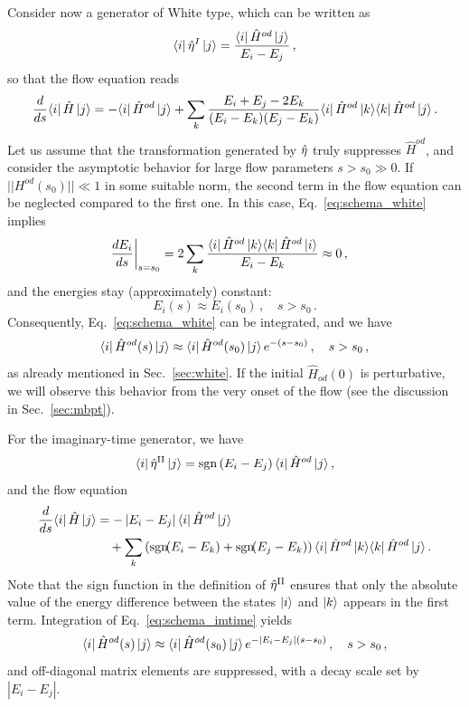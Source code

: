 Consider now a generator of White type, which can be written as
\begin{equation}
  \langle{i}|\,{\hat{\eta}^I}\,|{j}\rangle=\frac{\langle{i}|\,{\hat{H}^{od}}\,|{j}\rangle}{E_i-E_j}\,,
\end{equation}
so that the flow equation reads
\begin{align}
  \totd{}{s}\matrixe{i}{\hat{H}}{j}
  =-\matrixe{i}{\hat{H}^{od}}{j}
  +\sum_k\frac{E_i+E_j-2E_k}{(E_i-E_k)(E_j-E_k)}\matrixe{i}{\hat{H}^{od}}{k}\matrixe{k}{\hat{H}^{od}}{j}\,.\label{eq:schema_white}
\end{align}
Let us assume that the transformation generated by $\hat{\eta}$ truly
suppresses $\hat{H}^{od}$, and consider the asymptotic behavior for
large flow parameters $s>s_0\gg0$. If $||H^{od}(s_0)||\ll 1$ in some
suitable norm, the second term in the flow equation can be neglected
compared to the first one. In this case, Eq.~\eqref{eq:schema_white}
implies
\begin{align}
  \left. \frac{d {E_i}} {d {s}} \right|_{s=s_0}&=2\sum_k\frac{\langle{i}|\,{\hat{H}^{od}}\,|{k}\rangle\langle{k}|\,{\hat{H}^{od}}\,|{i}\rangle}{E_i-E_k}
  \approx0\,,
\end{align}
and the energies stay (approximately) constant:
\begin{equation}
  E_i(s) \approx E_i(s_0)\,,\quad s>s_0\,.
\end{equation}
Consequently, Eq.~\eqref{eq:schema_white} can be integrated, and we have
\begin{equation}
  \langle{i}|\,{\hat{H}^{od}(s)}\,|{j}\rangle \approx \langle{i}|\,{\hat{H}^{od}(s_0)}\,|{j}\rangle\,e^{-(s-s_0)}\,,\quad s>s_0\,,
\end{equation}
as already mentioned in Sec.~\ref{sec:white}. If the initial
$\hat{H}_{od}(0)$ is perturbative, we will observe this behavior from
the very onset of the flow (see the discussion in
Sec.~\ref{sec:mbpt}).

For the imaginary-time generator, we have
\begin{equation}
  \langle{i}|\,{\hat{\eta}^\text{II}}\,|{j}\rangle=\mathrm{sgn}\left(E_i-E_j\right)\langle{i}|\,{\hat{H}^{od}}\,|{j}\rangle\,,
\end{equation}
and the flow equation
\begin{align}
  \totd{}{s}\matrixe{i}{\hat{H}}{j}
  &=-\left|E_i-E_j\right|\matrixe{i}{\hat{H}^{od}}{j}\notag\\
  &\quad
    +\sum_k\left(\mathrm{sgn}\!\!\left(E_i-E_k\right)+\mathrm{sgn}\!\!\left(E_j-E_k\right)\right)\matrixe{i}{\hat{H}^{od}}{k}\matrixe{k}{\hat{H}^{od}}{j}\,.
    \label{eq:schema_imtime}
\end{align}
Note that the sign function in the definition of $\hat{\eta}^\text{II}$
ensures that only the absolute value of the energy difference between
the states $\ket{i}$ and $\ket{k}$ appears in the first
term. Integration of Eq.~\eqref{eq:schema_imtime} yields
\begin{equation}
  \langle{i}|\,{\hat{H}^{od}(s)}\,|{j}\rangle \approx \langle{i}|\,{\hat{H}^{od}(s_0)}\,|{j}\rangle\,e^{-|E_i-E_j|(s-s_0)}\,, \quad s>s_0\,,
\end{equation}
and off-diagonal matrix elements are suppressed, with a decay scale set by $|E_i-E_j|$.

